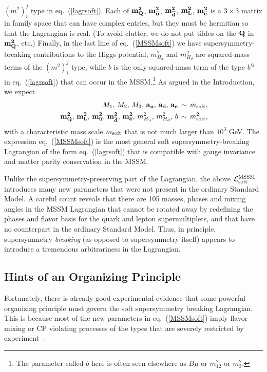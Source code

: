 \documentclass[11pt]{article}
\def\beq{\begin{eqnarray}}
\def\eeq{\end{eqnarray}}
\def\sbar{\overline}
\def\lagr{{\cal L}}
\begin{document}
$(m^2)_i^j$ type in eq.~(\ref{lagrsoft}). Each of ${\bf m^2_{ Q}}$, ${\bf
m^2_{{\sbar u}}}$, ${\bf m^2_{{\sbar d}}}$, ${\bf m^2_{L}}$, ${\bf
m^2_{{\sbar e}}}$ is a $3\times 3$ matrix in family space that can have
complex entries, but they must be hermitian so that the Lagrangian is
real. (To avoid clutter, we do not put tildes on the $\bf Q$ in $\bf
m^2_Q$, etc.) Finally, in the last line of eq.~(\ref{MSSMsoft}) we have
supersymmetry-breaking contributions to the Higgs potential; $m_{H_u}^2$
and $m_{H_d}^2$ are squared-mass terms of the $(m^2)_i^j$ type, while $b$
is the only squared-mass term of the type $b^{ij}$ in eq.~(\ref{lagrsoft})
that can occur in the MSSM.\footnote{The parameter called $b$ here is often
seen elsewhere as $B\mu$ or $m_{12}^2$ or $m_3^2$.} As argued in
the Introduction, we expect
\beq
&&\!\!\!\!\! M_1,\, M_2,\, M_3,\, {\bf a_u},\, {\bf a_d},\, {\bf a_e}\,
\sim\, m_{\rm soft},\\
&&\!\!\!\!\! {\bf m^2_{ Q}},\,
{\bf m^2_{L}},\,
{\bf m^2_{{\sbar u}}},\,
{\bf m^2_{{\sbar d}}},\,
{\bf m^2_{{\sbar e}}},\, m_{H_u}^2,\, m_{H_d}^2,\, b\, \sim \,
m_{\rm soft}^2 ,
\eeq
with a characteristic mass scale $m_{\rm soft}$ that is not much larger
than $10^3$ GeV. The expression eq.~(\ref{MSSMsoft}) is the most general
soft supersymmetry-breaking Lagrangian of the form eq.~(\ref{lagrsoft})
that is compatible with gauge invariance and matter parity conservation in
the MSSM. 

Unlike the supersymmetry-preserving part of the Lagrangian, the above
$\lagr_{\rm soft}^{\rm MSSM}$ introduces many new parameters that were not
present in the ordinary Standard Model. A careful count \cite{dimsut}
reveals that there are 105 masses, phases and mixing angles in the MSSM
Lagrangian that cannot be rotated away by redefining the phases and flavor
basis for the quark and lepton supermultiplets, and that have no
counterpart in the ordinary Standard Model. Thus, in principle,
supersymmetry {\em breaking} (as opposed to supersymmetry itself) appears
to introduce a tremendous arbitrariness in the Lagrangian. 

\subsection{Hints of an Organizing Principle}\label{subsec:mssm.hints}
\setcounter{equation}{0}

Fortunately, there is already good experimental evidence that some
powerful organizing principle must govern the soft supersymmetry breaking
Lagrangian. This is because most of the new parameters in
eq.~(\ref{MSSMsoft}) imply flavor mixing or CP violating processes of the
types that are severely restricted by experiment
\cite{FCNCs}-\cite{Ciuchini:2002uv}. 
\end{document}
